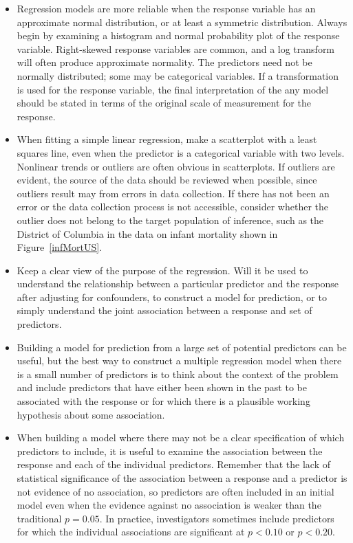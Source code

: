\begin{itemize}
	
	\item Regression models are more reliable when the response variable has an approximate normal distribution, or at least a symmetric distribution.  Always begin by examining a histogram and normal probability plot of the response variable.  Right-skewed response variables are common, and a log transform will often produce approximate normality. The predictors need not be normally distributed; some may be categorical variables.  If a transformation is used for the response variable, the final interpretation of the any model should be stated in terms of the original scale of measurement for the response.
	
	\item When fitting a simple linear regression, make a scatterplot with a least squares line, even when the predictor is a categorical variable with two levels.  Nonlinear trends or outliers are often obvious in scatterplots.  If outliers are evident, the source of the data should be reviewed when possible, since outliers result may from errors in data collection.  If there has not been an error or the data collection process is not accessible, consider whether the outlier does not belong to the target population of inference, such as the District of Columbia in the data on infant mortality shown in Figure~\ref{infMortUS}.
	
	\item Keep a clear view of the purpose of the regression.  Will it be used to understand the relationship between a particular predictor and the response after adjusting for confounders, to construct a model for prediction, or to simply understand the joint association between a response and set of predictors.
	
	\item Building a model for prediction from a large set of potential predictors can be useful, but the best way to construct a multiple regression model when there is a small number of predictors is to think about the context of the problem and include predictors that have either been shown in the past to be associated with the response or for which there is a plausible working hypothesis about some association.
	
	\item When building a model where there may not be a clear specification of which predictors to include, it is useful to examine the association between the response and each of the individual predictors.  Remember that the lack of statistical significance of the association between a response and a predictor is not evidence of no association, so predictors are often included in an initial model even when the evidence against no association is weaker than the traditional $p=0.05$.  In practice, investigators sometimes include predictors for which the individual associations are significant at $p < 0.10$ or $p < 0.20$.
	

\end{itemize}

